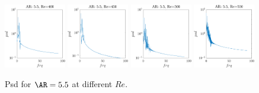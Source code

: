 \begin{figure}
  \centering
  \includegraphics[width=0.24\textwidth]{./fig/nnl/psdAR5.5RE400.png}
  \includegraphics[width=0.24\textwidth]{./fig/nnl/psdAR5.5RE450.png}
  \includegraphics[width=0.24\textwidth]{./fig/nnl/psdAR5.5RE500.png}
  \includegraphics[width=0.24\textwidth]{./fig/nnl/psdAR5.5RE550.png}
  \caption{Psd for $\AR=5.5$ at different $Re$.}
  \label{fig:ClCd}
\end{figure}

